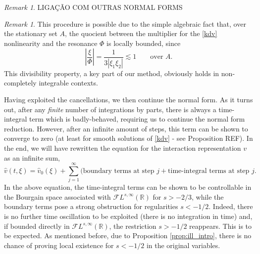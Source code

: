 \documentclass[%
11pt,  reqno]{amsart}
\newcommand{\5}{\textup{V}}
\theoremstyle{remark}
\newtheorem{remark}[theorem]{Remark}
\newcommand{\R}{\mathbb{R}}
\numberwithin{equation}{section}
\numberwithin{theorem}{section}
\begin{document}
	\begin{remark}
		LIGAÇÃO COM OUTRAS NORMAL FORMS
	\end{remark}
	
	
	\begin{remark}
		This procedure is possible due to the simple algebraic fact that, over the stationary set $A$, the quocient between the multiplier for the \eqref{kdv} nonlinearity and the resonance $\Phi$ is locally bounded, since
		$$
		\left|\frac{\xi}{\Phi}\right|=\frac{1}{3|\xi_1\xi_2|}\lesssim 1\qquad \mbox{over }A.
		$$
		This divisibility property, a key part of our method, obviously holds in non-completely integrable contexts.
	\end{remark}
	
	Having exploited the cancellations, we then continue the normal form. As it turns out, after any \emph{finite} number of integrations by parts, there is always a time-integral term which is badly-behaved, requiring us to continue the normal form reduction. However, after an infinite amount of steps, this term can be shown to converge to zero (at least for smooth solutions of \eqref{kdv} - see Proposition REF).  In the end, we will have rewritten the equation for the interaction representation $v$ as an infinite sum,
	\begin{equation}\label{eq:nfe_intro}
		\widehat{v}(t,\xi)= \widehat{v}_0(\xi) + \sum_{j=1}^\infty (\mbox{boundary terms at step } j+ \mbox{time-integral terms at step }j.
	\end{equation}
	In the above equation, the time-integral terms can be shown to be controllable in the Bourgain space associated with $\mathcal{F}L^{s,\infty}(\R)$ for $s>-2/3$, while the boundary terms pose a strong obstruction for regularities $s<-1/2$. Indeed, there is no further time oscillation to be exploited (there is no integration in time) and, if bounded directly in $\mathcal{F}L^{s,\infty}(\R)$, the restriction $s>-1/2$ reappears. This is to be expected. As mentioned before, due to Proposition \ref{prop:ill_intro}, there is no chance of proving local existence for $s<-1/2$ in the original variables.
	
	\medskip
	
\end{document}
